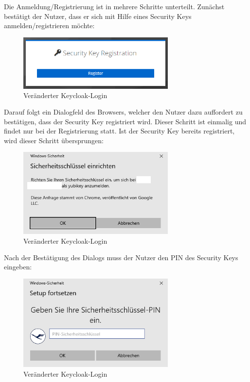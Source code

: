 Die Anmeldung/Registrierung ist in mehrere Schritte unterteilt. Zunächst bestätigt der Nutzer, dass er sich mit Hilfe eines Security Keys anmelden/registrieren möchte:

\begin{figure}[h]
	\centering 
	\includegraphics[width=0.7\textwidth]{img/abbildungen/reg001.png}
	\captionsetup{format=hang}
	\caption{Veränderter Keycloak-Login}
\end{figure}

Darauf folgt ein Dialogfeld des Browsers, welcher den Nutzer dazu auffordert zu bestätigen, dass der Security Key registriert wird. Dieser Schritt ist einmalig und findet nur bei der Registrierung statt. Ist der Security Key bereits registriert, wird dieser Schritt übersprungen:

\begin{figure}[h]
	\centering 
	\includegraphics[width=0.7\textwidth]{img/abbildungen/reg002.png}
	\captionsetup{format=hang}
	\caption{Veränderter Keycloak-Login}
\end{figure}

Nach der Bestätigung des Dialogs muss der Nutzer den PIN des Security Keys eingeben:

\begin{figure}[H]
	\centering 
	\includegraphics[width=0.7\textwidth]{img/abbildungen/reg003.png}
	\captionsetup{format=hang}
	\caption{Veränderter Keycloak-Login}
\end{figure}

